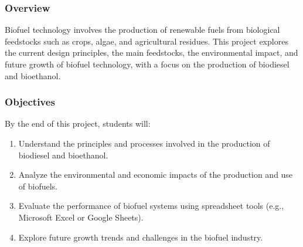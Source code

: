 \documentclass[letterpaper,10pt,english]{jupyterBook}
\begin{document}
\subsubsection{Overview}
\label{\detokenize{ProjectSyllabus:id22}}
\sphinxAtStartPar
Biofuel technology involves the production of renewable fuels from biological feedstocks such as crops, algae, and agricultural residues. This project explores the current design principles, the main feedstocks, the environmental impact, and future growth of biofuel technology, with a focus on the production of biodiesel and bioethanol.


\subsubsection{Objectives}
\label{\detokenize{ProjectSyllabus:id23}}
\sphinxAtStartPar
By the end of this project, students will:
\begin{enumerate}
%
\item {} 
\sphinxAtStartPar
Understand the principles and processes involved in the production of biodiesel and bioethanol.

\item {} 
\sphinxAtStartPar
Analyze the environmental and economic impacts of the production and use of biofuels.

\item {} 
\sphinxAtStartPar
Evaluate the performance of biofuel systems using spreadsheet tools (e.g., Microsoft Excel or Google Sheets).

\item {} 
\sphinxAtStartPar
Explore future growth trends and challenges in the biofuel industry.

\end{enumerate}
\end{document}
